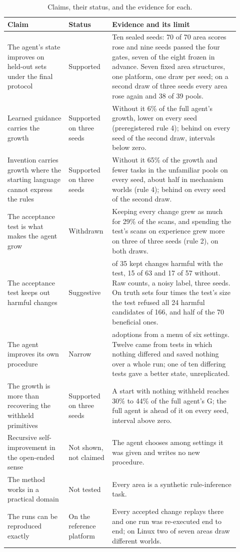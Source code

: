 \documentclass[11pt]{article}
\begin{document}
\begin{table}[t]
\centering
\caption{Claims, their status, and the evidence for each.}
\label{tab:claims}
\footnotesize
\begin{tabular}{>{\raggedright}p{0.25\linewidth}>{\raggedright}p{0.15\linewidth}>{\raggedright\arraybackslash}p{0.52\linewidth}}
\toprule
Claim & Status & Evidence and its limit \\
\midrule
The agent's state improves on held-out sets under the final protocol & Supported & Ten sealed seeds: 70 of 70 area scores rose and nine seeds passed the four gates, seven of the eight frozen in advance. Seven fixed area structures, one platform, one draw per seed; on a second draw of three seeds every area rose again and 38 of 39 pools. \\
Learned guidance carries the growth & Supported on three seeds & Without it 6\% of the full agent's growth, lower on every seed (preregistered rule 4); behind on every seed of the second draw, intervals below zero. \\
Invention carries growth where the starting language cannot express the rules & Supported on three seeds & Without it 65\% of the growth and fewer tasks in the unfamiliar pools on every seed, about half in mechanism worlds (rule 4); behind on every seed of the second draw. \\
The acceptance test is what makes the agent grow & Withdrawn & Keeping every change grew as much for 29\% of the scans, and spending the test's scans on experience grew more on three of three seeds (rule 2), on both draws. \\
The acceptance test keeps out harmful changes & Suggestive & 2 of 35 kept changes harmful with the test, 15 of 63 and 17 of 57 without. Raw counts, a noisy label, three seeds. On truth sets four times the test's size the test refused all 24 harmful candidates of 166, and half of the 70 beneficial ones. \\
The agent improves its own procedure & Narrow & 13 adoptions from a menu of six settings. Twelve came from tests in which nothing differed and saved nothing over a whole run; one of ten differing tests gave a better state, unreplicated. \\
The growth is more than recovering the withheld primitives & Supported on three seeds & A start with nothing withheld reaches 30\% to 44\% of the full agent's G; the full agent is ahead of it on every seed, interval above zero. \\
Recursive self-improvement in the open-ended sense & Not shown, not claimed & The agent chooses among settings it was given and writes no new procedure. \\
The method works in a practical domain & Not tested & Every area is a synthetic rule-inference task. \\
The runs can be reproduced exactly & On the reference platform & Every accepted change replays there and one run was re-executed end to end; on Linux two of seven areas draw different worlds. \\
\bottomrule
\end{tabular}
\end{table}
\end{document}
